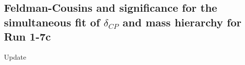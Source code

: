 %
\subsection {Feldman-Cousins and significance for the simultaneous fit of $\delta_{CP}$ and mass hierarchy for Run 1-7c}
\label{sec:fc_significance_run17c}
{\huge{Update}}
%
%
%
